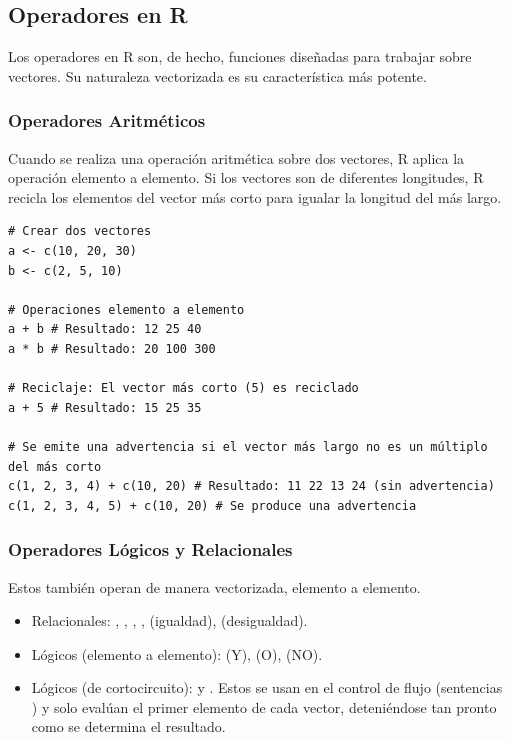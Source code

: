 \subsection*{Operadores en R}
Los operadores en R son, de hecho, funciones diseñadas para trabajar sobre vectores. Su naturaleza vectorizada es su característica más potente.

\subsubsection*{Operadores Aritméticos}
Cuando se realiza una operación aritmética sobre dos vectores, R aplica la operación elemento a elemento. Si los vectores son de diferentes longitudes, R recicla los elementos del vector más corto para igualar la longitud del más largo.

\begin{example}
\text{ }\begin{verbatim}
# Crear dos vectores
a <- c(10, 20, 30)
b <- c(2, 5, 10)

# Operaciones elemento a elemento
a + b # Resultado: 12 25 40
a * b # Resultado: 20 100 300

# Reciclaje: El vector más corto (5) es reciclado
a + 5 # Resultado: 15 25 35

# Se emite una advertencia si el vector más largo no es un múltiplo del más corto
c(1, 2, 3, 4) + c(10, 20) # Resultado: 11 22 13 24 (sin advertencia)
c(1, 2, 3, 4, 5) + c(10, 20) # Se produce una advertencia
\end{verbatim}
\end{example}

\subsubsection*{Operadores Lógicos y Relacionales}
Estos también operan de manera vectorizada, elemento a elemento.
\begin{itemize}
    \item Relacionales: \rcode{<}, \rcode{>}, \rcode{<=}, \rcode{>=}, \rcode{==} (igualdad), \rcode{!=} (desigualdad).
    \item Lógicos (elemento a elemento): \rcode{&} (Y), \rcode{|} (O), \rcode{!} (NO).
    \item Lógicos (de cortocircuito): \rcode{&&} y \rcode{||}. Estos se usan en el control de flujo (sentencias ) y solo evalúan el primer elemento de cada vector, deteniéndose tan pronto como se determina el resultado.
\end{itemize}

